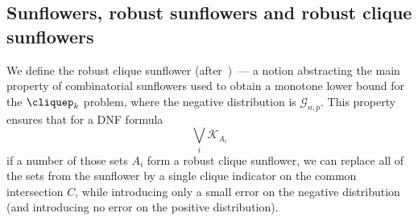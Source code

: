 \subsection{Sunflowers, robust sunflowers and robust clique sunflowers\label{sec:intro-sunflowers}}

We define the robust clique sunflower (after~\cite{cavalar2022})~--- a notion abstracting the main property of combinatorial sunflowers used to obtain a monotone lower bound for the $\cliquep_k$ problem, where the negative distribution is $\mathcal{G}_{n,p}$. This property ensures that for a DNF formula 
\begin{equation*}
    \bigvee_{i} \mathcal{K}_{A_i}
\end{equation*}
if a number of those sets $A_i$ form a robust clique sunflower, we can replace all of the sets from the sunflower by a single clique indicator on the common intersection $C$, while introducing only a small error on the negative distribution (and introducing no error on the positive distribution).

